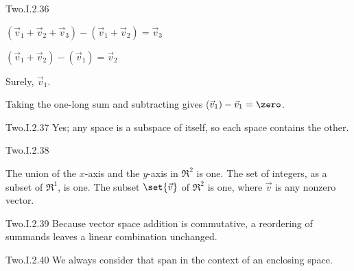 \begin{ans}{Two.I.2.36}
      \begin{exparts}
        \item $(\vec{v}_1+\vec{v}_2+\vec{v}_3)-(\vec{v}_1+\vec{v}_2)
                 =\vec{v}_3$
        \item $(\vec{v}_1+\vec{v}_2)-(\vec{v}_1)
                 =\vec{v}_2$
        \item Surely, $\vec{v}_1$.
        \item Taking the one-long sum and subtracting gives
          ($\vec{v}_1)-\vec{v}_1=\zero$.
      \end{exparts}
    
\end{ans}
\begin{ans}{Two.I.2.37}
      Yes; any space is a subspace of itself, so each space contains the
      other.
    
\end{ans}
\begin{ans}{Two.I.2.38}
      \begin{exparts}
        \partsitem The union of the \( x \)-axis and the \( y \)-axis
          in \( \Re^2 \) is one.
        \partsitem The set of integers, as a subset of \( \Re^1 \), is one.
        \partsitem The subset \( \set{\vec{v}} \) of \( \Re^2 \) is one,
          where $\vec{v}$ is any nonzero vector.
      \end{exparts}
     
\end{ans}
\begin{ans}{Two.I.2.39}
      Because vector space addition is commutative, a reordering of
      summands leaves a linear combination unchanged.
    
\end{ans}
\begin{ans}{Two.I.2.40}
      We always consider that span in the context of an enclosing space.
    
\end{ans}
